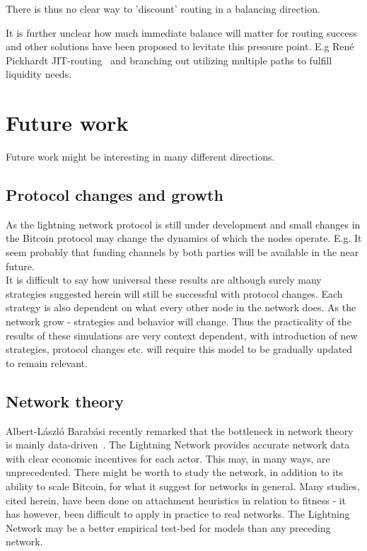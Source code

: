 There is thus no clear way to 'discount' routing in a balancing direction.

It is further unclear how much immediate balance will matter for routing success and other solutions have been proposed to levitate this pressure point. E.g René Pickhardt JIT-routing~\cite{pickard:jit} and branching out utilizing multiple paths to fulfill liquidity needs.   

\section{Future work}

Future work might be interesting in many different directions.

\subsection{Protocol changes and growth}

As the lightning network protocol is still under development and small changes in the Bitcoin protocol may change the dynamics of which the nodes operate. E.g. It seem probably that funding channels by both parties will be available in the near future. \\

It is difficult to say how universal these results are although surely many strategies suggested herein will still be successful with protocol changes. Each strategy is also dependent on what every other node in the network does. As the network grow - strategies and behavior will change. Thus the practicality of the results of these simulations are very context dependent, with introduction of new strategies, protocol changes etc. will require this model to be gradually updated to remain relevant.  

\subsection{Network theory}

Albert-László Barabási recently remarked that the bottleneck in network theory is mainly data-driven~\cite{barabasi:decade:beyond}. The \gls{Lightning Network} provides accurate network data with clear economic incentives for each actor. This may, in many ways, are unprecedented. There might be worth to study the network, in addition to its ability to scale Bitcoin, for what it suggest for networks in general. Many studies, cited herein, have been done on attachment heuristics in relation to fitness - it has however, been difficult to apply in practice to real networks. The \gls{Lightning Network} may be a better empirical test-bed for models than any preceding network. 

